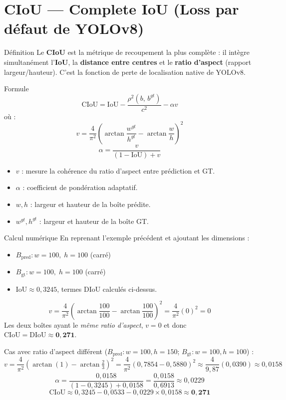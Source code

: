 \documentclass[12pt, a4paper]{report}
\newcommand{\IoU}{\text{IoU}}
\begin{document}
\section{CIoU — Complete IoU (Loss par défaut de YOLOv8)}

\begin{definitionbox}{Définition}
  Le \textbf{CIoU} est la métrique de recoupement la plus complète : il intègre
  simultanément l'\textbf{IoU}, la \textbf{distance entre centres} et le
  \textbf{ratio d'aspect} (rapport largeur/hauteur). C'est la fonction de perte
  de localisation native de YOLOv8.
\end{definitionbox}

\begin{formulebox}{Formule}
  \[
    \text{CIoU} = \IoU - \frac{\rho^2(b,\, b^{gt})}{c^2} - \alpha v
  \]
  où :
  \[
    v = \frac{4}{\pi^2} \left(\arctan\frac{w^{gt}}{h^{gt}}
        - \arctan\frac{w}{h}\right)^2
  \]
  \[
    \alpha = \frac{v}{(1 - \IoU) + v}
  \]
  \begin{itemize}
    \item $v$ : mesure la cohérence du ratio d'aspect entre prédiction et GT.
    \item $\alpha$ : coefficient de pondération adaptatif.
    \item $w, h$ : largeur et hauteur de la boîte prédite.
    \item $w^{gt}, h^{gt}$ : largeur et hauteur de la boîte GT.
  \end{itemize}
\end{formulebox}

\begin{examplebox}{Calcul numérique}
  En reprenant l'exemple précédent et ajoutant les dimensions :
  \begin{itemize}
    \item $B_{\text{pred}} : w=100,\; h=100$ (carré)
    \item $B_{\text{gt}} : w=100,\; h=100$ (carré)
    \item $\IoU \approx 0{,}3245$, termes DIoU calculés ci-dessus.
  \end{itemize}
  \[
    v = \frac{4}{\pi^2}\left(\arctan\frac{100}{100} - \arctan\frac{100}{100}\right)^2
      = \frac{4}{\pi^2}(0)^2 = 0
  \]
  Les deux boîtes ayant le \emph{même ratio d'aspect}, $v=0$ et donc
  $\text{CIoU} = \text{DIoU} \approx \mathbf{0{,}271}$.

  \vspace{0.3cm}
  Cas avec ratio d'aspect différent ($B_{\text{pred}} : w=100, h=150$;
  $B_{\text{gt}} : w=100, h=100$) :
  \[
    v = \frac{4}{\pi^2}\left(\arctan(1) - \arctan\tfrac{2}{3}\right)^2
      = \frac{4}{\pi^2}(0{,}7854 - 0{,}5880)^2 \approx \frac{4}{9{,}87}(0{,}0390)
      \approx 0{,}0158
  \]
  \[
    \alpha = \frac{0{,}0158}{(1-0{,}3245)+0{,}0158} = \frac{0{,}0158}{0{,}6913} \approx 0{,}0229
  \]
  \[
    \text{CIoU} \approx 0{,}3245 - 0{,}0533 - 0{,}0229 \times 0{,}0158 \approx \mathbf{0{,}271}
  \]
\end{examplebox}
\end{document}
